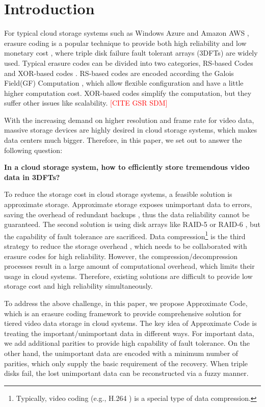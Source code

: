\documentclass[sigconf]{acmart}
\begin{document}
\section{Introduction}
For typical cloud storage systems such as Windows Azure \cite{calder2011windows} and Amazon AWS \cite{bermudez2013exploring}, erasure coding is a popular technique to provide both high reliability and low monetary cost \cite{EVENODD, RDP, BlaumRoth, XCode, CRS, TripleStar, TPtech, RSL}, where triple disk failure fault tolerant arrays (3DFTs) are widely used. Typical erasure codes can be divided into two categories, RS-based Codes \cite{RS} \cite{LRC} and XOR-based codes \cite{EVENODD, hcode, STAR, tip}. RS-based codes are encoded according the Galois Field(GF) Computation \cite{RS}, which allow flexible configuration and have a little higher computation cost. XOR-based codes simplify the computation, but they suffer other issues like scalability. \textcolor{red}{[CITE GSR SDM]}

With the increasing demand on higher resolution and frame rate for video data, massive storage devices are highly desired in cloud storage systems, which makes data centers much bigger.
Therefore, in this paper, we set out to answer the following question:

\textbf{In a cloud storage system, how to efficiently store tremendous video data in 3DFTs?}

To reduce the storage cost in cloud storage systems, a feasible solution is approximate storage. Approximate storage exposes unimportant data to errors, saving the overhead of redundant backups \cite{niklaus2018context, sampson2014approximate} , thus the data reliability cannot be guaranteed.
The second solution is using disk arrays like RAID-5 or RAID-6 \cite{RAID}, but the capability of fault tolerance are sacrificed.
Data compression\footnote{Typically, video coding (e.g., H.264 \cite{wiegand2003overview}) is a special type of data compression.}
is the third strategy to reduce the storage overhead \cite{ziv1977universal, ziv1978compression, deutsch1996deflate}, which needs to be collaborated with erasure codes for high reliability. However, the compression/decompression processes result in a large amount of computational overhead, which limits their usage in cloud systems. 
Therefore, existing solutions are difficult to provide low storage cost and high reliability simultaneously.

To address the above challenge, in this paper, we propose Approximate Code, which is an erasure coding framework to provide comprehensive solution for tiered video data storage in cloud systems. The key idea of Approximate Code is treating the important/unimportant data in different ways. For important data, we add additional parities to provide high capability of fault tolerance. On the other hand, the unimportant data are encoded with a minimum number of parities, which only supply the basic requirement of the recovery. When triple disks fail, the lost unimportant data can be reconstructed via a fuzzy manner.
\end{document}
